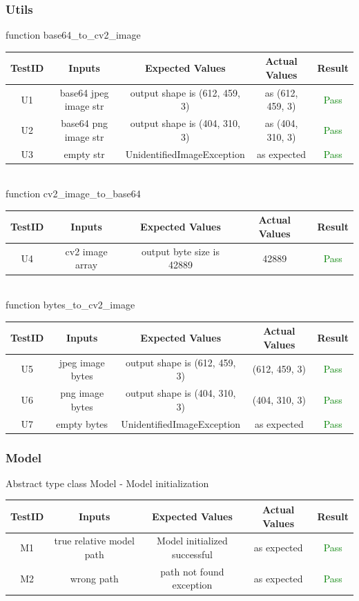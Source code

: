 \documentclass[12pt, titlepage]{article}
\begin{document}
\subsubsection{Utils}
function base64\_to\_cv2\_image \\
\begin{tabular}{ |c|c|c|c|c| } 
 \hline
 TestID & Inputs & Expected Values & Actual Values & Result \\ 
 \hline
U1 & base64 jpeg image str & output shape is (612, 459, 3) & as (612, 459, 3) & \textcolor{green}{Pass} \\ 
U2 & base64 png image str & output shape is (404, 310, 3) & as (404, 310, 3) & \textcolor{green}{Pass} \\ 
U3 & empty str & UnidentifiedImageException & as expected & \textcolor{green}{Pass} \\ 
 \hline
\end{tabular}
\\
\newline
function cv2\_image\_to\_base64 \\
\begin{tabular}{ |c|c|c|c|c| } 
 \hline
 TestID & Inputs & Expected Values & Actual Values & Result \\ 
 \hline
U4 & cv2 image array & output byte size is 42889 & 42889 & \textcolor{green}{Pass} \\ 
 \hline
\end{tabular}
\\
\newline
function bytes\_to\_cv2\_image \\
\begin{tabular}{ |c|c|c|c|c| } 
 \hline
 TestID & Inputs & Expected Values & Actual Values & Result \\ 
 \hline
U5 & jpeg image bytes & output shape is (612, 459, 3) & (612, 459, 3) & \textcolor{green}{Pass} \\ 
U6 & png image bytes & output shape is (404, 310, 3) & (404, 310, 3) & \textcolor{green}{Pass} \\
U7 & empty bytes & UnidentifiedImageException & as expected & \textcolor{green}{Pass} \\
 \hline
\end{tabular}
\subsubsection{Model}

Abstract type class Model - Model initialization\\
\newline
\begin{tabular}{ |c|c|c|c|c| } 
 \hline
 TestID & Inputs & Expected Values & Actual Values & Result \\ 
 \hline
M1 & true relative model path & Model initialized successful & as expected & \textcolor{green}{Pass} \\ 
M2 & wrong path & path not found exception & as expected & \textcolor{green}{Pass} \\ 
 \hline
\end{tabular}
\end{document}
